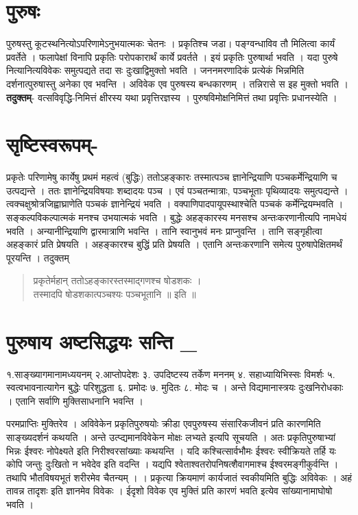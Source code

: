 \section*{पुरुषः}

पुरुषस्तु कूटस्थनित्योऽपरिणामेऽनुभयात्मकः चेतनः । प्रकृतिश्च जडा। पङ्ग्वन्धाविव तौ मिलित्वा कार्यं प्रवर्तेते । फलापेक्षां विनापि प्रकृतिः परोपकारार्थं कार्ये प्रवर्तते । इयं प्रकृतिः पुरुषार्था भवति । यदा पुरुषे नित्यानित्यविवेकः समुत्पद्यते तदा सः दुःखाद्विमुक्तो भवति । जननमरणादिकं प्रत्येकं भिन्नमिति दर्शनात्पुरुषास्तु अनेका एव भवन्ति । अविवेक एव पुरुषस्य बन्धकारणम् । तन्निरासे स इह मुक्तो भवति । \textbf{तदुक्तम्}- वत्सविवृद्धि-निमित्तं क्षीरस्य यथा प्रवृत्तिरज्ञस्य । पुरुषविमोक्षनिमित्तं तथा प्रवृत्तिः प्रधानस्येति ।

\section*{सृष्टिस्वरूपम्-} 

प्रकृतेः परिणामेषु कार्येषु प्रथमं महत्वं (बुद्धिः)  ततोऽहङ्कारः  तस्मात्पञ्च ज्ञानेन्द्रियाणि पञ्चकर्मेन्द्रियाणि च उत्पद्यन्ते । ततः ज्ञानेन्द्रियविषयाः शब्दादयः पञ्च । एवं पञ्चतन्मात्राः, पञ्चभूताः पृथिव्यादयः समुत्पद्यन्ते । त्वक्चक्षुश्रोत्रजिह्वाघ्राणेति पञ्चकं ज्ञानेन्द्रियं भवति । वक्पाणिपादपायूपस्थाश्चेति पञ्चकं कर्मेन्द्रियम्भवति । सङ्कल्पविकल्पात्मकं मनश्च उभयात्मकं भवति । बुद्धेः अहङ्कारस्य मनसश्च अन्तःकरणानीत्यपि नामधेयं भवति । अन्यानीन्द्रियाणि द्वारमात्राणि भवन्ति । तानि स्वानुभवं मनः प्राप्नुवन्ति । तानि सङ्गृहीत्वा अहङ्कारं प्रति प्रेषयति । अहङ्कारश्च बुद्धिं प्रति प्रेषयति । एतानि अन्तःकरणानि समेत्य पुरुषापेक्षितमर्थं पूरयन्ति । तदुक्तम् 
\begin{verse}
प्रकृतेर्महान् ततोऽहङ्कारस्तस्माद्गणश्च षोडशकः ।\\
तस्मादपि षोडशकात्पञ्चश्यः पञ्चभूतानि ॥ इति ॥
\end{verse}

\section*{पुरुषाय अष्टसिद्धयः सन्ति \_}

१.साङ्ख्यागमानामध्ययनम् 	२.आप्तोपदेशः ३.  उपदिष्टस्य तर्केण मननम्
४. सहाध्यायिभिस्सः विमर्शः 	५. स्वत्वभावनात्यागेन बुद्धेः परिशुद्धता	६. प्रमोदः
७. मुदितः	८. मोदः च । अन्ते विद्यमानास्त्रयः दुःखनिरोधकाः । एतानि सर्वाणि मुक्तिसाधनानि भवन्ति ।

परमप्राप्तिः मुक्तिरेव । अविवेकेन प्रकृतिपुरुषयोः क्रीडा एवपुरुषस्य संसारिकजीवनं प्रति कारणमिति साङ्ख्यदर्शनं कथयति । अन्ते उत्प्द्यमानविवेकेन मोक्षः लभ्यते इत्यपि सूचयति । अतः प्रकृतिपुरुषाभ्यां भिन्नः ईश्वरः नोपेक्ष्यते इति निरीश्वरसांख्याः कथयन्ति । यदि कश्चित्सार्वभौमः ईश्वरः स्वीक्रियते तर्हि यः कोपि जन्तुः दुःखितो न भवेदेव इति वदन्ति । यद्यपि श्वेताश्वतरोपनिषत्शैवागमाश्च ईश्वरमङ्गीकुर्वन्ति । तथापि भौतविषयभूतं शरीरमेव चैतन्यम् । । प्रकृत्या क्रियमाणं कार्यजातं स्वकीयमिति बुद्धिः अविवेकः । अहं तावन्न तादृशः इति ज्ञानमेव विवेकः । ईदृशो विवेक एव मुक्तिं प्रति कारणं भवति इत्येव सांख्यानामाघोषो भवति ।

\articleend
